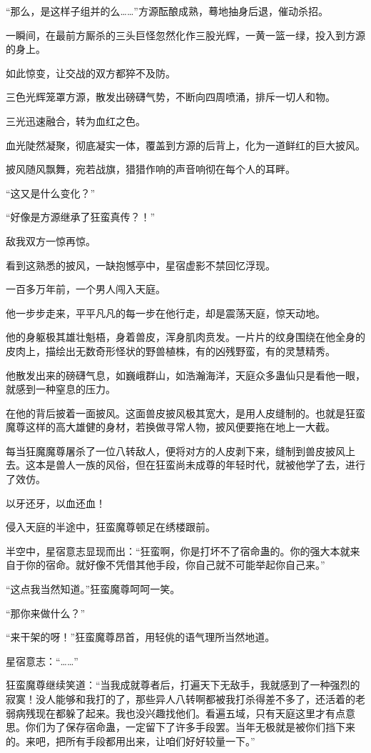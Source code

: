 \begin{this_body}
“那么，是这样子组并的么……”方源酝酿成熟，蓦地抽身后退，催动杀招。

一瞬间，在最前方厮杀的三头巨怪忽然化作三股光辉，一黄一篮一绿，投入到方源的身上。

如此惊变，让交战的双方都猝不及防。

三色光辉笼罩方源，散发出磅礴气势，不断向四周喷涌，排斥一切人和物。

三光迅速融合，转为血红之色。

血光陡然凝聚，彻底凝实一体，覆盖到方源的后背上，化为一道鲜红的巨大披风。

披风随风飘舞，宛若战旗，猎猎作响的声音响彻在每个人的耳畔。

“这又是什么变化？”

“好像是方源继承了狂蛮真传？！”

敌我双方一惊再惊。

看到这熟悉的披风，一缺抱憾亭中，星宿虚影不禁回忆浮现。

一百多万年前，一个男人闯入天庭。

他一步步走来，平平凡凡的每一步在他行走，却是震荡天庭，惊天动地。

他的身躯极其雄壮魁梧，身着兽皮，浑身肌肉贲发。一片片的纹身围绕在他全身的皮肉上，描绘出无数奇形怪状的野兽植株，有的凶残野蛮，有的灵慧精秀。

他散发出来的磅礴气息，如巍峨群山，如浩瀚海洋，天庭众多蛊仙只是看他一眼，就感到一种窒息的压力。

在他的背后披着一面披风。这面兽皮披风极其宽大，是用人皮缝制的。也就是狂蛮魔尊这样的高大雄健的身材，若换做寻常人物，披风便要拖在地上一大截。

每当狂魔魔尊屠杀了一位八转敌人，便将对方的人皮剥下来，缝制到兽皮披风上去。这本是兽人一族的风俗，但在狂蛮尚未成尊的年轻时代，就被他学了去，进行了效仿。

以牙还牙，以血还血！

侵入天庭的半途中，狂蛮魔尊顿足在绣楼跟前。

半空中，星宿意志显现而出：“狂蛮啊，你是打坏不了宿命蛊的。你的强大本就来自于你的宿命。就好像不凭借其他手段，你自己就不可能举起你自己来。”

“这点我当然知道。”狂蛮魔尊呵呵一笑。

“那你来做什么？”

“来干架的呀！”狂蛮魔尊昂首，用轻佻的语气理所当然地道。

星宿意志：“……”

狂蛮魔尊继续笑道：“当我成就尊者后，打遍天下无敌手，我就感到了一种强烈的寂寞！没人能够和我打的了，那些异人八转啊都被我打杀得差不多了，还活着的老弱病残现在都躲了起来。我也没兴趣找他们。看遍五域，只有天庭这里才有点意思。你们为了保存宿命蛊，一定留下了许多手段罢。当年无极就是被你们挡下来的。来吧，把所有手段都用出来，让咱们好好较量一下。”


\end{this_body}
